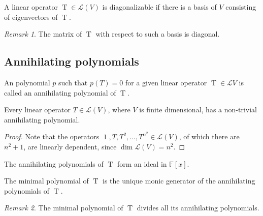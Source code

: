 \documentclass[11pt]{article}
\newcommand{\F}{\mathbb{F}}
\newcommand{\op}[1]{\operatorname{#1}}
\newcommand{\opT}{\op{T}}
\newcommand{\alg}[1]{\mathscr{#1}}
\newcommand{\algL}{\alg{L}}
\newcommand{\dim}{\operatorname{dim}}
\theoremstyle{definition}
\theoremstyle{remark}
\newtheorem*{remark}{Remark}
\numberwithin{equation}{section}
\begin{document}
    \begin{definition}
        A linear operator $\opT \in \alg{L}(V)$ is diagonalizable if there is a basis of
        $V$ consisting of eigenvectors of $\opT$.
        \begin{remark}
            The matrix of $\opT$ with respect to such a basis is diagonal.
        \end{remark}
    \end{definition}

    \subsection{Annihilating polynomials}
    
    \begin{definition}
        An polynomial $p$ such that $p(T) = 0$ for a given linear operator $\opT \in
        \algL{V}$ is called an annihilating polynomial of $\opT$.
    \end{definition}

    \begin{lemma}
        Every linear operator $T\in\alg{L}(V)$, where $V$ is finite dimensional, has
        a non-trivial annihilating polynomial.
    \end{lemma}
    \begin{proof}
        Note that the operators $\op{1}, T, T^2, \dots, T^{n^2} \in \alg{L}(V)$, of
        which there are $n^2 + 1$, are linearly dependent, since $\dim{\algL(V)} =
        n^2$.
    \end{proof}

    \begin{lemma}
        The annihilating polynomials of $\opT$ form an ideal in $\F[x]$.
    \end{lemma}

    \begin{definition}
        The minimal polynomial of $\opT$ is the unique monic generator of the
        annihilating polynomials of $\opT$.
        \begin{remark}
            The minimal polynomial of $\opT$ divides all its annihilating polynomials.
        \end{remark}
    \end{definition}
\end{document}
